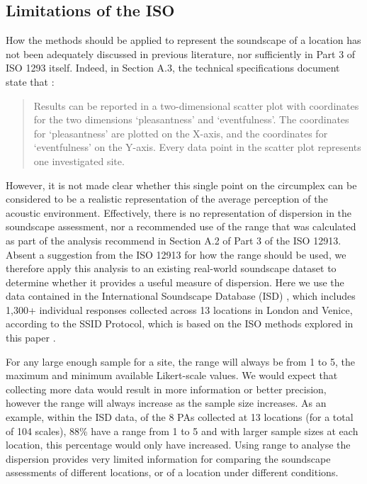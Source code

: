 \subsection{Limitations of the ISO}
How the \citet{ISO12913Part3} methods should be applied to represent the soundscape of a location has not been adequately discussed in previous literature, nor sufficiently in Part 3 of ISO 1293 itself. Indeed, in Section A.3, the technical specifications document state that \citep[p. 5]{ISO12913Part3}:

\begin{quote}
  Results can be reported in a two-dimensional scatter plot with coordinates for the two dimensions ‘pleasantness’ and ‘eventfulness’. The coordinates for ‘pleasantness’ are plotted on the X-axis, and the coordinates for ‘eventfulness’ on the Y-axis. Every data point in the scatter plot represents one investigated site.
\end{quote}

However, it is not made clear whether this single point on the circumplex can be considered to be a realistic representation of the average perception of the acoustic environment. Effectively, there is no representation of dispersion in the soundscape assessment, nor a recommended use of the range that was calculated as part of the analysis recommend in Section A.2 of Part 3 of the ISO 12913. Absent a suggestion from the ISO 12913 for how the range should be used, we therefore apply this analysis to an existing real-world soundscape dataset to determine whether it provides a useful measure of dispersion. Here we use the data contained in the International Soundscape Database (ISD) \citep{Mitchell2021International}, which includes 1,300+ individual responses collected across 13 locations in London and Venice, according to the SSID Protocol, which is based on the ISO methods explored in this paper \citep{Mitchell2020Soundscape}.

For any large enough sample for a site, the range will always be from 1 to 5, the maximum and minimum available Likert-scale values. We would expect that collecting more data would result in more information or better precision, however the range will always increase as the sample size increases. As an example, within the ISD data, of the 8 PAs collected at 13 locations (for a total of 104 scales), 88\% have a range from 1 to 5 and with larger sample sizes at each location, this percentage would only have increased. Using range to analyse the dispersion provides very limited information for comparing the soundscape assessments of different locations, or of a location under different conditions.


